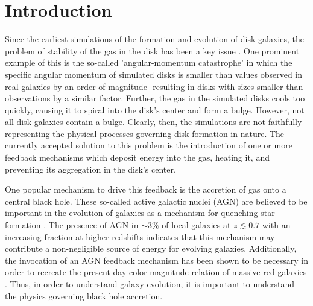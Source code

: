\section{Introduction}

Since the earliest simulations of the formation and evolution of disk
galaxies, the problem of stability of the gas in the disk has been
a key issue \citep[e.g., ][]{lucy1977anumerical}. One prominent example
of this is the so-called 'angular-momentum catastrophe' \citep{navarro1994accretion}
in which the specific angular momentum of simulated disks is smaller
than values observed in real galaxies by an order of magnitude- resulting
in disks with sizes smaller than observations by a similar factor.
Further, the gas in the simulated disks cools too quickly, causing
it to spiral into the disk's center and form a bulge. However, not
all disk galaxies contain a bulge. Clearly, then, the simulations
are not faithfully representing the physical processes governing disk
formation in nature. The currently accepted solution to this problem
is the introduction of one or more feedback mechanisms which deposit
energy into the gas, heating it, and preventing its aggregation in
the disk's center.

One popular mechanism to drive this feedback is the accretion of gas
onto a central black hole. These so-called active galactic nuclei
(AGN) are believed to be important in the evolution of galaxies as
a mechanism for quenching star formation \citep[see ][and references therein]{hopkins2008acosmological}.
The presence of AGN in $\sim3\%$ of local galaxies at $z\lesssim0.7$
\citep{haggard2010thefield} with an increasing fraction at higher
redshifts \citep{martini2013thecluster} indicates that this mechanism
may contribute a non-negligible source of energy for evolving galaxies.
Additionally, the invocation of an AGN feedback mechanism has been
shown to be necessary in order to recreate the present-day color-magnitude
relation of massive red galaxies \citep{springel2005blackholes}.
Thus, in order to understand galaxy evolution, it is important to
understand the physics governing black hole accretion.

